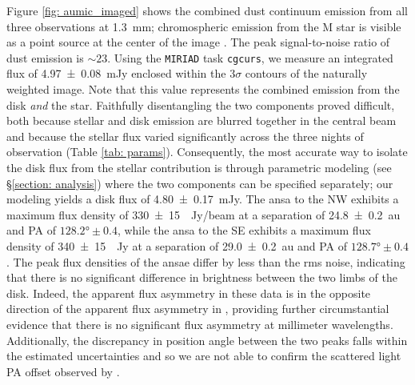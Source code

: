 \documentclass[modern]{aastex62}
\begin{document}
Figure \ref{fig: aumic_imaged} shows the combined dust continuum emission from all three observations at \SI{1.3}{mm}; chromospheric emission from the M star is visible as a point source at the center of the image \citep{cranmer13}. 
The peak signal-to-noise ratio of dust emission is $\sim 23$.
Using the \texttt{MIRIAD} task \texttt{cgcurs}, we measure an integrated flux of \SI{4.97 \pm 0.08}{\milli Jy} enclosed within the $3\sigma$ contours of the naturally weighted image.  
Note that this value represents the combined emission from the disk \textit{and} the star. 
Faithfully disentangling the two components proved difficult, both because stellar and disk emission are blurred together in the central beam and because the stellar flux varied significantly across the three nights of observation (Table \ref{tab: params}).
Consequently, the most accurate way to isolate the disk flux from the stellar contribution is through parametric modeling (see \S \ref{section: analysis}) where the two components can be specified separately; our modeling yields a disk flux of \SI{4.80 \pm 0.17}{mJy}.
The ansa to the NW exhibits a maximum flux density of \SI{330 \pm 15}{\mu Jy/beam} at a separation of \SI{24.8 \pm 0.2}{au} and PA of $\ang[angle-symbol-over-decimal]{128.2} \pm 0.4$, while the ansa to the SE exhibits a maximum flux density of \SI{340 \pm 15}{\mu Jy} at a separation of \SI{29.0 \pm 0.2}{au} and PA of $\ang[angle-symbol-over-decimal]{128.7} \pm 0.4$. 
The peak flux densities of the ansae differ by less than the rms noise, indicating that there is no significant difference in brightness between the two limbs of the disk.
Indeed, the apparent flux asymmetry in these data is in the opposite direction of the apparent flux asymmetry in \cite{macgregor13}, providing further circumstantial evidence that there is no significant flux asymmetry at millimeter wavelengths. 
Additionally, the discrepancy in position angle between the two peaks falls within the estimated uncertainties and so we are not able to confirm the scattered light PA offset observed by \cite{boccaletti15}. 
\end{document}
